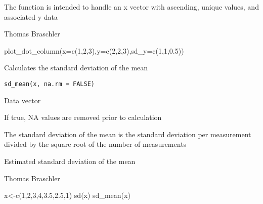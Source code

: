 \documentclass[a4paper]{book}
\begin{document}
%
\begin{Details}\relax
The function is intended to handle an x vector with ascending, unique values, and associated y data
\end{Details}
%
\begin{Author}\relax
Thomas Braschler
\end{Author}
%
\begin{Examples}
\begin{ExampleCode}
plot_dot_column(x=c(1,2,3),y=c(2,2,3),sd_y=c(1,1,0.5))

\end{ExampleCode}
\end{Examples}
%
\begin{Description}\relax
Calculates the standard deviation of the mean
\end{Description}
%
\begin{Usage}
\begin{verbatim}
sd_mean(x, na.rm = FALSE)
\end{verbatim}
\end{Usage}
%
\begin{Arguments}
\begin{ldescription}
\item[\code{x}] 
Data vector
\item[\code{na.rm}]  If true, NA values are removed prior to calculation 

\end{ldescription}
\end{Arguments}
%
\begin{Details}\relax
The standard deviation of the mean is the standard deviation per measurement divided by the square root of the number of measurements
\end{Details}
%
\begin{Value}
Estimated standard deviation of the mean
\end{Value}
%
\begin{Author}\relax
Thomas Braschler
\end{Author}
%
\begin{Examples}
\begin{ExampleCode}
x<-c(1,2,3,4,3.5,2.5,1)
sd(x)
sd_mean(x)

\end{ExampleCode}
\end{Examples}
\end{document}
